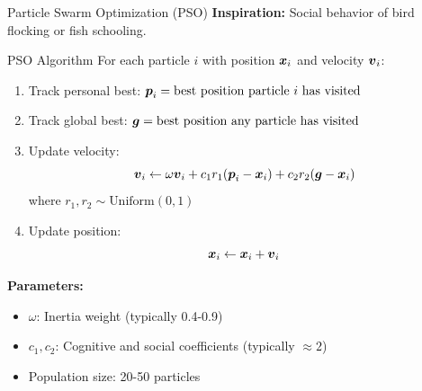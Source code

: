 \documentclass[aspectratio=169]{beamer}
\begin{document}
\begin{frame}{Particle Swarm Optimization (PSO)}
  \textbf{Inspiration:} Social behavior of bird flocking or fish schooling.

  \vspace{0.5em}

  \begin{examplebox}{PSO Algorithm}
    For each particle $i$ with position $\boldsymbol{x}_i$ and velocity $\boldsymbol{v}_i$:

    \begin{enumerate}
      \item Track personal best: $\boldsymbol{p}_i = \text{best position particle } i \text{ has visited}$
      \item Track global best: $\boldsymbol{g} = \text{best position any particle has visited}$
      \item Update velocity:
      $$\boldsymbol{v}_i \leftarrow \omega \boldsymbol{v}_i + c_1 r_1 (\boldsymbol{p}_i - \boldsymbol{x}_i) + c_2 r_2 (\boldsymbol{g} - \boldsymbol{x}_i)$$
      where $r_1, r_2 \sim \text{Uniform}(0,1)$
      \item Update position:
      $$\boldsymbol{x}_i \leftarrow \boldsymbol{x}_i + \boldsymbol{v}_i$$
    \end{enumerate}
  \end{examplebox}

  \vspace{0.5em}

  \textbf{Parameters:}
  \begin{itemize}
    \item $\omega$: Inertia weight (typically 0.4-0.9)
    \item $c_1, c_2$: Cognitive and social coefficients (typically $\approx 2$)
    \item Population size: 20-50 particles
  \end{itemize}
\end{frame}
\end{document}

